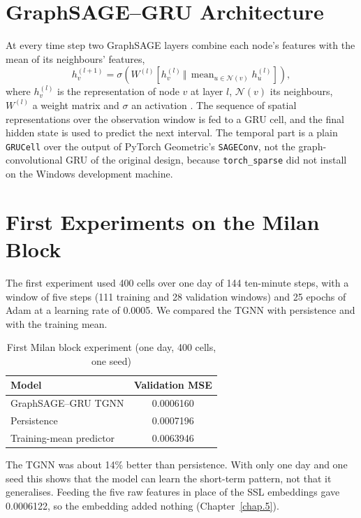 \section{GraphSAGE--GRU Architecture}
\label{sec:graphsage_gru}
At every time step two GraphSAGE layers combine each node's features with the mean of its neighbours' features,
\begin{equation}
h_v^{(l+1)} = \sigma\!\left(W^{(l)}\left[h_v^{(l)} \,\Vert\, \operatorname{mean}_{u\in\mathcal{N}(v)} h_u^{(l)}\right]\right),
\label{eq:graphsage_update}
\end{equation}
where $h_v^{(l)}$ is the representation of node $v$ at layer $l$, $\mathcal{N}(v)$ its neighbours, $W^{(l)}$ a weight matrix and $\sigma$ an activation \cite{hamilton2017}. The sequence of spatial representations over the observation window is fed to a GRU cell, and the final hidden state is used to predict the next interval. The temporal part is a plain \texttt{GRUCell} over the output of PyTorch Geometric's \texttt{SAGEConv}, not the graph-convolutional GRU of the original design, because \texttt{torch\_sparse} did not install on the Windows development machine.

\section{First Experiments on the Milan Block}
\label{sec:milan_tgnn_experiments}
The first experiment used 400 cells over one day of 144 ten-minute steps, with a window of five steps (111 training and 28 validation windows) and 25 epochs of Adam at a learning rate of 0.0005. We compared the TGNN with persistence and with the training mean.
\begin{table}[htbp]
\centering
\caption{First Milan block experiment (one day, 400 cells, one seed)}
\label{tab:milan_forecasting}
\begin{tabular}{|l|c|}
\hline
\textbf{Model} & \textbf{Validation MSE} \\ \hline
GraphSAGE--GRU TGNN & 0.0006160 \\ \hline
Persistence & 0.0007196 \\ \hline
Training-mean predictor & 0.0063946 \\ \hline
\end{tabular}
\end{table}
The TGNN was about 14\% better than persistence. With only one day and one seed this shows that the model can learn the short-term pattern, not that it generalises. Feeding the five raw features in place of the SSL embeddings gave 0.0006122, so the embedding added nothing (Chapter~\ref{chap.5}).

